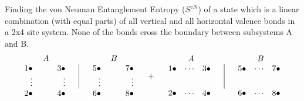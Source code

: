 Finding the von Neuman Entanglement Entropy ($S^{vN}$) of a state which is a linear combination (with equal parts) of all vertical and all horizontal valence bonds in a 2x4 site system.
None of the bonds cross the boundary between subsystems A and B. 
\begin{eqnarray*}
			\begin{array}{rrr}
			&A&\\
			1\bullet&\quad&3\bullet\\
			\vdots&&\vdots\\
			2\bullet&&4\bullet
			\end {array} \quad \Biggl\lvert\quad
			\begin{array}{rrr}
			&B&\\
			5\bullet&\quad&7\bullet\\
			\vdots&&\vdots\\
			6\bullet&&8\bullet
			\end {array} \quad + \quad
			\begin{array}{rrr}
			&A&\\
			1\bullet&\cdots&3\bullet\\
			&&\\ \noalign{\medskip}
			2\bullet&\cdots&4\bullet
			\end {array} \quad \Biggl\lvert\quad
			\begin{array}{rrr}
			&B&\\
			5\bullet&\cdots&7\bullet\\
			&&\\ \noalign{\medskip}
			6\bullet&\cdots&8\bullet
			\end {array} 
\end{eqnarray*}
